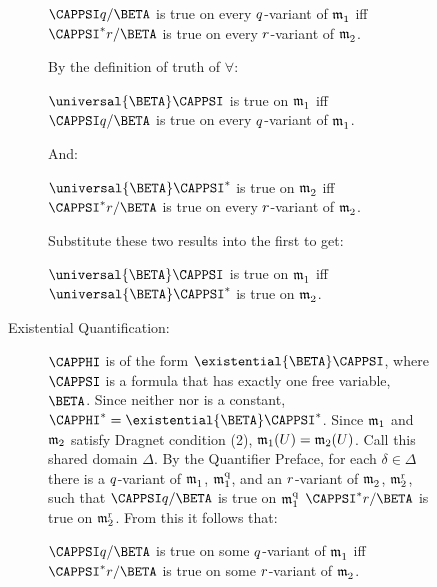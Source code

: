 \begin{PROOF}
\begin{description}
\begin{description}
\begin{description}
	\begin{center}
		$\CAPPSI\variable{q}/\BETA$ is true on every $q$-variant of $\mathfrak{m^{\mathrm{}}_{\mathrm{1}}}$ iff\\
		$\CAPPSI^*\variable{r}/\BETA$ is true on every $r$-variant of $\mathfrak{m^{\mathrm{}}_{\mathrm{2}}}$.
	\end{center}

	By the definition of truth of $\forall$:

	\begin{center}
		$\universal{\BETA}\CAPPSI$ is true on $\mathfrak{m^{\mathrm{}}_{\mathrm{1}}}$ iff
		$\CAPPSI\variable{q}/\BETA$ is true on every $q$-variant of $\mathfrak{m^{\mathrm{}}_{\mathrm{1}}}$.
	\end{center}

	And:

	\begin{center}
		$\universal{\BETA}\CAPPSI^*$ is true on $\mathfrak{m^{\mathrm{}}_{\mathrm{2}}}$ iff
		$\CAPPSI^*\variable{r}/\BETA$ is true on every $r$-variant of $\mathfrak{m^{\mathrm{}}_{\mathrm{2}}}$.
	\end{center}

	Substitute these two results into the first to get:

	\begin{center}
		$\universal{\BETA}\CAPPSI$ is true on $\mathfrak{m^{\mathrm{}}_{\mathrm{1}}}$
		iff $\universal{\BETA}\CAPPSI^*$ is true on $\mathfrak{m^{\mathrm{}}_{\mathrm{2}}}$.
	\end{center}

	\item[Existential Quantification:] $\CAPPHI$ is of the form $\existential{\BETA}\CAPPSI$, where $\CAPPSI$ is a formula that has exactly one free variable, $\BETA$.
	Since neither \mention{$\exists$} nor \mention{$\BETA$} is a constant, $\CAPPHI^*=\existential{\BETA}\CAPPSI^*$.
	Since $\mathfrak{m}_1$ and $\mathfrak{m}_2$ satisfy Dragnet condition (2), $\mathfrak{m}_1(U)=\mathfrak{m}_2(U)$.
	Call this shared domain $\Delta$.
	By the Quantifier Preface, for each $\delta\in\Delta$ there is a $q$-variant of $\mathfrak{m^{\mathrm{}}_{\mathrm{1}}}$, $\mathfrak{m^{\mathrm{q}}_{\mathrm{1}}}$, and an $r$-variant of $\mathfrak{m^{\mathrm{}}_{\mathrm{2}}}$, $\mathfrak{m^{\mathrm{r}}_{\mathrm{2}}}$, such that $\CAPPSI\variable{q}/\BETA$ is true on $\mathfrak{m^{\mathrm{q}}_{\mathrm{1}}}$ \Iff $\CAPPSI^*\variable{r}/\BETA$ is true on $\mathfrak{m^{\mathrm{r}}_{\mathrm{2}}}$.
	From this it follows that:

	\begin{center}
		$\CAPPSI\variable{q}/\BETA$ is true on some $q$-variant of $\mathfrak{m^{\mathrm{}}_{\mathrm{1}}}$ iff\\
		$\CAPPSI^*\variable{r}/\BETA$ is true on some $r$-variant of $\mathfrak{m^{\mathrm{}}_{\mathrm{2}}}$.
	\end{center}


\end{description}
\end{description}
\end{description}
\end{PROOF}
